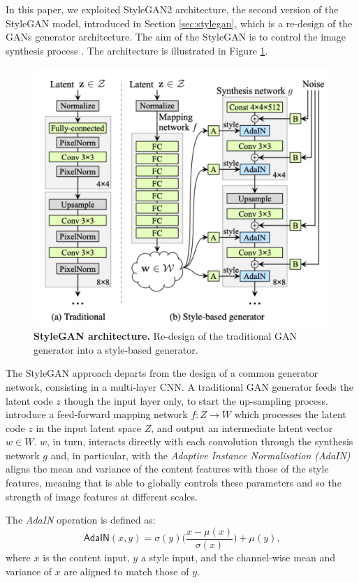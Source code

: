 \documentclass{article}
\begin{document}
	In this paper, we exploited StyleGAN2 architecture, the second version of the StyleGAN model, 
	introduced in Section \ref{sec:stylegan}, which is a re-design of the GANs generator architecture.
	The aim of the StyleGAN is to control the image synthesis process \cite{karras2019style}. The 
	architecture is illustrated in Figure \ref{fig:styleGAN}.
	\begin{figure}[!h]				
		\centering
		\includegraphics[width=.5\linewidth]{images/styleGAN}
		\caption{\textbf{StyleGAN architecture.} Re-design of the traditional GAN generator into a 
			style-based generator.}
		\label{fig:styleGAN}
	\end{figure}
	
	The StyleGAN approach departs from the design of a common generator network, consisting in a 
	multi-layer CNN.
	A traditional GAN generator feeds the latent code $z$ though the input layer only, to start the 
	up-sampling process.
	\citet{karras2019style} introduce a feed-forward mapping network $f : Z \rightarrow W$ which 
	processes the latent code $z$ in the input latent space $Z$, and output an intermediate latent 
	vector $w \in W$. 
	$w$, in turn, interacts directly with each convolution through the synthesis network  $g$ and, in 
	particular, with the \textit{Adaptive Instance Normalisation (AdaIN)} \cite{huang2017arbitrary} aligns 
	the mean and variance of the content features with those of the style features, meaning that is able 
	to globally controls these parameters and so the strength of image features at different scales. 
	
	The \textit{AdaIN} operation is defined as:
	\begin{equation}
		\label{e:adain}
		\mathsf{AdaIN}(x, y) = \sigma(y) \bigg(\frac{x - \mu(x)}{\sigma (x)} \bigg) + \mu (y) \mbox{,}
	\end{equation}
	where $x$ is the content input, $y$ a style input, and the channel-wise mean and variance of $x$ 
	are aligned to match those of $y$.
	
\end{document}
